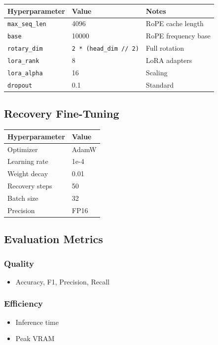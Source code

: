 \begin{table}[H]
\centering
\small
\begin{tabular}{lll}
\toprule
\textbf{Hyperparameter} & \textbf{Value} & \textbf{Notes} \\
\midrule
\texttt{max\_seq\_len} & 4096 & RoPE cache length \\
\texttt{base} & 10000 & RoPE frequency base \\
\texttt{rotary\_dim} & \texttt{2 * (head\_dim // 2)} & Full rotation \\
\texttt{lora\_rank} & 8 & LoRA adapters \\
\texttt{lora\_alpha} & 16 & Scaling \\
\texttt{dropout} & 0.1 & Standard \\
\bottomrule
\end{tabular}
\end{table}

\subsection{Recovery Fine-Tuning}

\begin{table}[H]
\centering
\small
\begin{tabular}{ll}
\toprule
\textbf{Hyperparameter} & \textbf{Value} \\
\midrule
Optimizer & AdamW \\
Learning rate & 1e-4 \\
Weight decay & 0.01 \\
Recovery steps & 50 \\
Batch size & 32 \\
Precision & FP16 \\
\bottomrule
\end{tabular}
\end{table}

\subsection{Evaluation Metrics}

\subsubsection{Quality}
\begin{itemize}
\item Accuracy, F1, Precision, Recall

\end{itemize}
\subsubsection{Efficiency}
\begin{itemize}
\item Inference time
\item Peak VRAM

\end{itemize}
